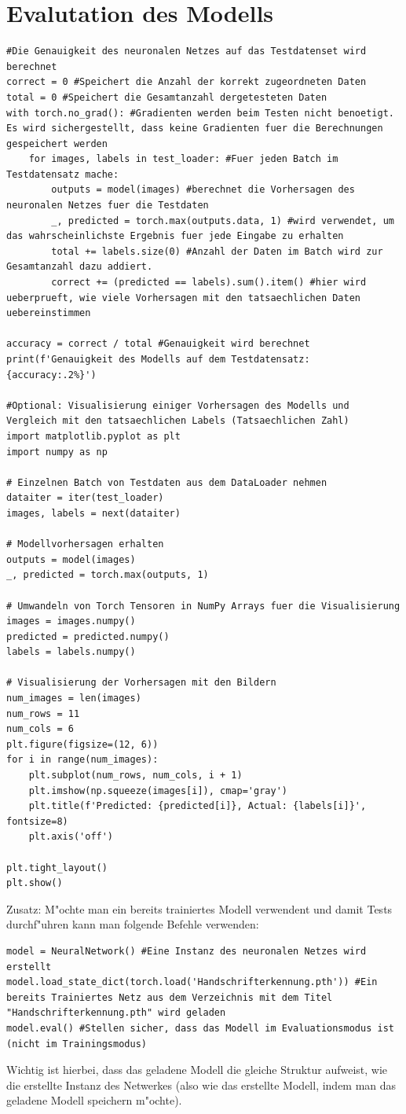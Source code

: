 \documentclass[a4paper,11pt,titlepage]{article}
\begin{document}
\section{Evalutation des Modells}
\begin{lstlisting}[style = python]
#Die Genauigkeit des neuronalen Netzes auf das Testdatenset wird berechnet
correct = 0 #Speichert die Anzahl der korrekt zugeordneten Daten
total = 0 #Speichert die Gesamtanzahl dergetesteten Daten
with torch.no_grad(): #Gradienten werden beim Testen nicht benoetigt. Es wird sichergestellt, dass keine Gradienten fuer die Berechnungen gespeichert werden
    for images, labels in test_loader: #Fuer jeden Batch im Testdatensatz mache:
        outputs = model(images) #berechnet die Vorhersagen des neuronalen Netzes fuer die Testdaten
        _, predicted = torch.max(outputs.data, 1) #wird verwendet, um das wahrscheinlichste Ergebnis fuer jede Eingabe zu erhalten
        total += labels.size(0) #Anzahl der Daten im Batch wird zur Gesamtanzahl dazu addiert.
        correct += (predicted == labels).sum().item() #hier wird ueberprueft, wie viele Vorhersagen mit den tatsaechlichen Daten uebereinstimmen

accuracy = correct / total #Genauigkeit wird berechnet
print(f'Genauigkeit des Modells auf dem Testdatensatz: {accuracy:.2%}')

#Optional: Visualisierung einiger Vorhersagen des Modells und Vergleich mit den tatsaechlichen Labels (Tatsaechlichen Zahl)
import matplotlib.pyplot as plt
import numpy as np

# Einzelnen Batch von Testdaten aus dem DataLoader nehmen
dataiter = iter(test_loader)
images, labels = next(dataiter)

# Modellvorhersagen erhalten
outputs = model(images)
_, predicted = torch.max(outputs, 1)

# Umwandeln von Torch Tensoren in NumPy Arrays fuer die Visualisierung
images = images.numpy()
predicted = predicted.numpy()
labels = labels.numpy()

# Visualisierung der Vorhersagen mit den Bildern
num_images = len(images)
num_rows = 11
num_cols = 6
plt.figure(figsize=(12, 6))
for i in range(num_images):
    plt.subplot(num_rows, num_cols, i + 1)
    plt.imshow(np.squeeze(images[i]), cmap='gray')
    plt.title(f'Predicted: {predicted[i]}, Actual: {labels[i]}', fontsize=8)
    plt.axis('off')

plt.tight_layout()
plt.show()
\end{lstlisting}
Zusatz: M"ochte man ein bereits trainiertes Modell verwendent und damit Tests durchf"uhren kann man folgende Befehle verwenden:
\begin{lstlisting}[style = python]
model = NeuralNetwork() #Eine Instanz des neuronalen Netzes wird erstellt
model.load_state_dict(torch.load('Handschrifterkennung.pth')) #Ein bereits Trainiertes Netz aus dem Verzeichnis mit dem Titel "Handschrifterkennung.pth" wird geladen
model.eval() #Stellen sicher, dass das Modell im Evaluationsmodus ist (nicht im Trainingsmodus)
\end{lstlisting}
Wichtig ist hierbei, dass das geladene Modell die gleiche Struktur aufweist, wie die erstellte Instanz des Netwerkes (also wie das erstellte Modell, indem man das geladene Modell speichern m"ochte).
\end{document}
